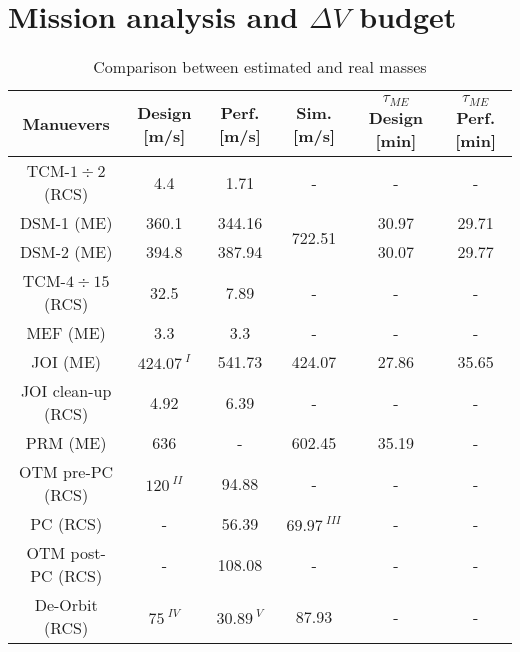 \section{Mission analysis and \texorpdfstring{$\Delta V$}{Delta-V} budget}
\label{sec:ma_and_dv}

\begin{table}[H]
    \renewcommand{\arraystretch}{1.3}
    \centering
    \begin{tabular}{|c|c|c|c|c|c|}
        \hline
        \textbf{Manuevers} & \textbf{Design} [m/s] & \textbf{Perf.} [m/s] & \textbf{Sim.} [m/s] & \textbf{$\tau_{ME}$ Design} [min] & \textbf{$\tau_{ME}$ Perf.} [min]  \\
        \hline
        TCM\cite{junno_inner}-$1\div2$ (RCS) & 4.4 & 1.71 & - & - & - \\
        \hline     
        \multicolumn{1}{|c|}{DSM\cite{junno_inner}-1 (ME)} & \multicolumn{1}{c|}{360.1} & \multicolumn{1}{c|}{344.16} & \multirow{2}{*}{722.51} & \multicolumn{1}{c|}{30.97} & \multicolumn{1}{c|}{29.71} \\
        \cline{1-3}
        \cline{5-6}
        \multicolumn{1}{|c|}{DSM\cite{junno_inner}-2 (ME)} & \multicolumn{1}{c|}{394.8} & \multicolumn{1}{c|}{387.94} & & \multicolumn{1}{c|}{30.07} & \multicolumn{1}{c|}{29.77} \\
        \hline
        TCM\cite{junno_inner}-$4\div15$ (RCS) & 32.5 & 7.89 & - & - & - \\
        \hline
        MEF\cite{junno_inner} (ME) & 3.3 & 3.3 & - & - & - \\
        \hline
        JOI\cite{otm} (ME) & $424.07^{\;I}$ & 541.73 & 424.07 & 27.86 & 35.65 \\
        \hline 
        JOI\cite{otm} clean-up (RCS) & 4.92 & 6.39 & - & - & - \\
        \hline
        PRM\cite{otm} (ME) & 636 & - & 602.45 & 35.19 & - \\
        \hline
        OTM\cite{nasa_otm} pre-PC (RCS) & $120^{\;II}$ & 94.88 & - & - & - \\
        \hline 
        PC (RCS) & - & 56.39 & $69.97^{\;III}$ & - & - \\
        \hline
        OTM post-PC (RCS) & - & 108.08 & - & - & - \\
        \hline
        De-Orbit\cite{spaceflight101} (RCS) & $75^{\;IV}$ & $30.89^{\;V} $& 87.93 & - & -\\
        \hline
    \end{tabular}
    \caption{Comparison between estimated and real masses}
    \label{table:masses}
\end{table}

